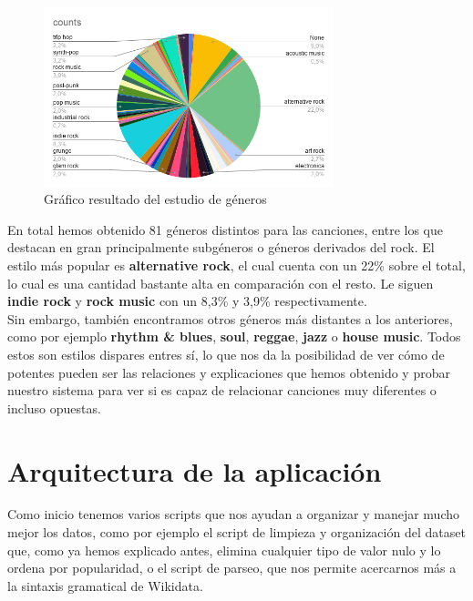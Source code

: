 \begin{figure}[h!]
	\centering
	\includegraphics[width = 0.75\textwidth]{Imagenes/Bitmap/estudioGeneros.png}
	\caption{Gráfico resultado del estudio de géneros}
	\label{fig:sampleImage}
\end{figure}

En total hemos obtenido 81 géneros distintos para las canciones, entre los que destacan en gran principalmente subgéneros o géneros derivados del rock. El estilo más popular es \textbf{alternative rock}, el cual cuenta con un 22\% sobre el total, lo cual es una cantidad bastante alta en comparación con el resto. Le siguen \textbf{indie rock} y \textbf{rock music} con un 8,3\% y 3,9\% respectivamente.\\

Sin embargo, también encontramos otros géneros más distantes a los anteriores, como por ejemplo \textbf{rhythm \& blues}, \textbf{soul}, \textbf{reggae}, \textbf{jazz} o \textbf{house music}. Todos estos son estilos dispares entres sí, lo que nos da la posibilidad de ver cómo de potentes pueden ser las relaciones y explicaciones que hemos obtenido y probar nuestro sistema para ver si es capaz de relacionar canciones muy diferentes o incluso opuestas.\\

\section{Arquitectura de la aplicación}

Como inicio tenemos varios scripts que nos ayudan a organizar y manejar mucho mejor los datos, como por ejemplo el script de limpieza y organización del dataset que, como ya hemos explicado antes, elimina cualquier tipo de valor nulo y lo ordena por popularidad, o el script de parseo, que nos permite acercarnos más a la sintaxis gramatical de Wikidata.\\


